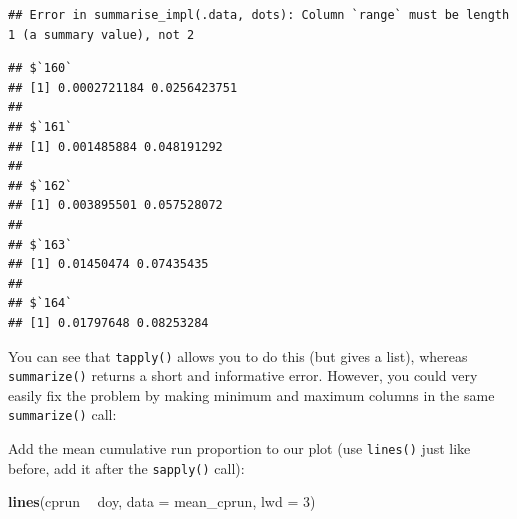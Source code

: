 \documentclass[]{book}
\newenvironment{Shaded}{\begin{snugshade}}{\end{snugshade}}
\newcommand{\KeywordTok}[1]{\textcolor[rgb]{0.13,0.29,0.53}{\textbf{#1}}}
\newcommand{\DataTypeTok}[1]{\textcolor[rgb]{0.13,0.29,0.53}{#1}}
\newcommand{\DecValTok}[1]{\textcolor[rgb]{0.00,0.00,0.81}{#1}}
\newcommand{\StringTok}[1]{\textcolor[rgb]{0.31,0.60,0.02}{#1}}
\newcommand{\CommentTok}[1]{\textcolor[rgb]{0.56,0.35,0.01}{\textit{#1}}}
\newcommand{\OperatorTok}[1]{\textcolor[rgb]{0.81,0.36,0.00}{\textbf{#1}}}
\newcommand{\NormalTok}[1]{#1}
\theoremstyle{definition}
\theoremstyle{definition}
\theoremstyle{definition}
\theoremstyle{remark}
\begin{document}
\begin{verbatim}
## Error in summarise_impl(.data, dots): Column `range` must be length 1 (a summary value), not 2
\end{verbatim}

\begin{Shaded}
\end{Shaded}

\begin{verbatim}
## $`160`
## [1] 0.0002721184 0.0256423751
## 
## $`161`
## [1] 0.001485884 0.048191292
## 
## $`162`
## [1] 0.003895501 0.057528072
## 
## $`163`
## [1] 0.01450474 0.07435435
## 
## $`164`
## [1] 0.01797648 0.08253284
\end{verbatim}

You can see that \texttt{tapply()} allows you to do this (but gives a
list), whereas \texttt{summarize()} returns a short and informative
error. However, you could very easily fix the problem by making minimum
and maximum columns in the same \texttt{summarize()} call:

\begin{Shaded}
\end{Shaded}

Add the mean cumulative run proportion to our plot (use \texttt{lines()}
just like before, add it after the \texttt{sapply()} call):

\begin{Shaded}
\begin{Highlighting}[]
\KeywordTok{lines}\NormalTok{(cprun }\OperatorTok{~}\StringTok{ }\NormalTok{doy, }\DataTypeTok{data =}\NormalTok{ mean_cprun, }\DataTypeTok{lwd =} \DecValTok{3}\NormalTok{)}
\end{Highlighting}
\end{Shaded}
\end{document}
